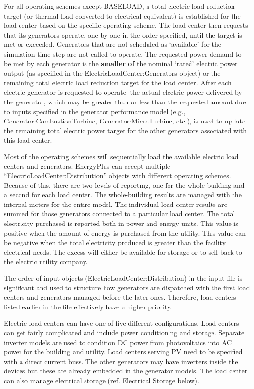 For all operating schemes except BASELOAD, a total electric load reduction target (or thermal load converted to electrical equivalent) is established for the load center based on the specific operating scheme. The load center then requests that its generators operate, one-by-one in the order specified, until the target is met or exceeded. Generators that are not scheduled as `available' for the simulation time step are not called to operate. The requested power demand to be met by each generator is the \textbf{smaller of} the nominal `rated' electric power output (as specified in the ElectricLoadCenter:Generators object) or the remaining total electric load reduction target for the load center. After each electric generator is requested to operate, the actual electric power delivered by the generator, which may be greater than or less than the requested amount due to inputs specified in the generator performance model (e.g., Generator:CombustionTurbine, Generator:MicroTurbine, etc.), is used to update the remaining total electric power target for the other generators associated with this load center.

Most of the operating schemes will sequentially load the available electric load centers and generators. EnergyPlus can accept multiple ``ElectricLoadCenter:Distribution'' objects with different operating schemes. Because of this, there are two levels of reporting, one for the whole building and a second for each load center. The whole-building results are managed with the internal meters for the entire model. The individual load-center results are summed for those generators connected to a particular load center. The total electricity purchased is reported both in power and energy units. This value is positive when the amount of energy is purchased from the utility. This value can be negative when the total electricity produced is greater than the facility electrical needs. The excess will either be available for storage or to sell back to the electric utility company.

The order of input objects (ElectricLoadCenter:Distribution) in the input file is significant and used to structure how generators are dispatched with the first load centers and generators managed before the later ones. Therefore, load centers listed earlier in the file effectively have a higher priority.

Electric load centers can have one of five different configurations. Load centers can get fairly complicated and include power conditioning and storage. Separate inverter models are used to condition DC power from photovoltaics into AC power for the building and utility. Load centers serving PV need to be specified with a direct current buss. The other generators may have inverters inside the devices but these are already embedded in the generator models. The load center can also manage electrical storage (ref. Electrical Storage below).

